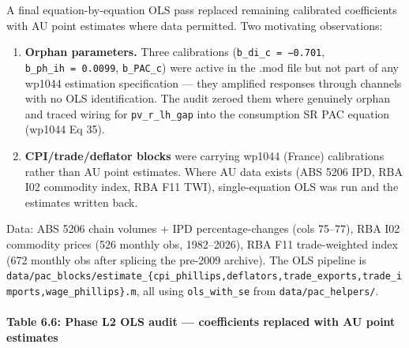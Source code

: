 \documentclass[
]{article}
\providecommand{\tightlist}{%
  \setlength{\itemsep}{0pt}\setlength{\parskip}{0pt}}
\begin{document}
A final equation-by-equation OLS pass replaced remaining calibrated
coefficients with AU point estimates where data permitted. Two
motivating observations:

\begin{enumerate}
\def\labelenumi{\arabic{enumi}.}
\tightlist
\item
  \textbf{Orphan parameters.} Three calibrations
  (\texttt{b\_di\_c\ =\ −0.701}, \texttt{b\_ph\_ih\ =\ 0.0099},
  \texttt{b\_PAC\_c}) were active in the .mod file but not part of any
  wp1044 estimation specification --- they amplified responses through
  channels with no OLS identification. The audit zeroed them where
  genuinely orphan and traced wiring for \texttt{pv\_r\_lh\_gap} into
  the consumption SR PAC equation (wp1044 Eq 35).
\item
  \textbf{CPI/trade/deflator blocks} were carrying wp1044 (France)
  calibrations rather than AU point estimates. Where AU data exists (ABS
  5206 IPD, RBA I02 commodity index, RBA F11 TWI), single-equation OLS
  was run and the estimates written back.
\end{enumerate}

Data: ABS 5206 chain volumes + IPD percentage-changes (cols 75--77), RBA
I02 commodity prices (526 monthly obs, 1982--2026), RBA F11
trade-weighted index (672 monthly obs after splicing the pre-2009
archive). The OLS pipeline is
\texttt{data/pac\_blocks/estimate\_\{cpi\_phillips,deflators,trade\_exports,trade\_imports,wage\_phillips\}.m},
all using \texttt{ols\_with\_se} from \texttt{data/pac\_helpers/}.

\paragraph{Table 6.6: Phase L2 OLS audit --- coefficients replaced with
AU point
estimates}\label{table-6.6-phase-l2-ols-audit-coefficients-replaced-with-au-point-estimates}
\end{document}
